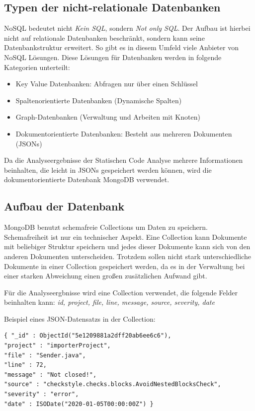 \subsection{Typen der nicht-relationale Datenbanken}
NoSQL bedeutet nicht \emph{Kein SQL}, sondern \emph{Not only SQL}. Der Aufbau ist hierbei nicht auf relationale Datenbanken beschränkt, sondern kann seine Datenbankstruktur erweitert. 
So gibt es in diesem Umfeld viele Anbieter von NoSQL Lösungen. Diese Lösungen für Datenbanken werden in folgende Kategorien unterteilt:

\begin{itemize}
\item Key Value Datenbanken: Abfragen nur über einen Schlüssel
\item Spaltenorientierte Datenbanken (Dynamische Spalten)
\item Graph-Datenbanken (Verwaltung und Arbeiten mit Knoten)
\item Dokumentorientierte Datenbanken: Besteht aus mehreren Dokumenten (JSONs)
\end{itemize}

Da die Analyseergebnisse der Statischen Code Analyse mehrere Informationen beinhalten, die leicht in JSONs gespeichert werden können, wird die dokumentorientierte Datenbank MongoDB verwendet. 

\subsection{Aufbau der Datenbank}
MongoDB benutzt schemafreie Collections um Daten zu speichern. Schemafreiheit ist nur ein technischer Aspekt. Eine Collection kann Dokumente mit beliebiger Struktur speichern und jedes dieser Dokumente kann sich von den anderen Dokumenten unterscheiden. Trotzdem sollen nicht stark unterschiedliche Dokumente in einer Collection gespeichert werden, da es in der Verwaltung bei einer starken Abweichung einen großen zusätzlichen Aufwand gibt. 

Für die Analyseergbnisse wird eine Collection verwendet, die folgende Felder beinhalten kann: \textit{id, project, file, line, message, source, severity, date}

Beispiel eines JSON-Datensatzs in der Collection:

\begin{verbatim}
{ "_id" : ObjectId("5e1209881a2dff20ab6ee6c6"), 
"project" : "importerProject", 
"file" : "Sender.java", 
"line" : 72, 
"message" : "Not closed!", 
"source" : "checkstyle.checks.blocks.AvoidNestedBlocksCheck", 
"severity" : "error", 
"date" : ISODate("2020-01-05T00:00:00Z") }
\end{verbatim}

